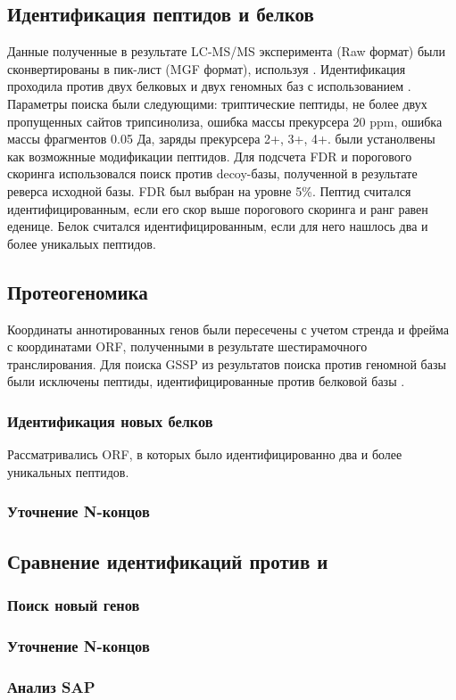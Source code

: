 \subsection{Идентификация пептидов и белков}
Данные полученные в результате LC-MS/MS эксперимента (Raw формат) были сконвертированы в пик-лист (MGF формат), используя  \cite{chambers2012cross}. Идентификация проходила против двух белковых и двух геномных баз с использованием  \cite{cottrell1999probability}. Параметры поиска были следующими: триптические пептиды, не более двух пропущенных сайтов трипсинолиза, ошибка массы прекурсера 20 ppm, ошибка массы фрагментов 0.05 Да, заряды прекурсера 2+, 3+, 4+.  были устанолвены как возможнные модификации пептидов. Для подсчета FDR и порогового скоринга использовался поиск против decoy-базы, полученной в результате реверса исходной базы. FDR был выбран на уровне 5\%.
Пептид считался идентифицированным, если его скор выше порогового скоринга и ранг равен еденице. Белок считался идентифицированным, если для него нашлось два и более уникальых пептидов.

\subsection{Протеогеномика }
Координаты аннотированных генов были пересечены с учетом стренда и фрейма с координатами ORF, полученными в результате шестирамочного транслирования.
Для поиска GSSP из результатов поиска против геномной базы  были исключены пептиды, идентифицированные против белковой базы . 

\subsubsection{Идентификация новых белков}
Рассматривались ORF, в которых было идентифицированно два и более уникальных пептидов.

\subsubsection{Уточнение N-концов}

\subsection{Сравнение идентификаций против  и }

\subsubsection{Поиск новый генов}

\subsubsection{Уточнение N-концов}

\subsubsection{Анализ SAP}





\newpage
